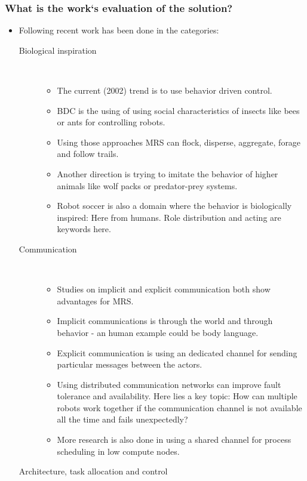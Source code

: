 \subsubsection*{What is the work`s evaluation of the solution?}
\begin{itemize}
    \item Following recent work has been done in the categories: \
    \begin{description}
        \item[Biological inspiration] \ 
        \begin{itemize} 
            \item The current (2002) trend is to use behavior driven control.
            \item BDC is the using of using social characteristics of insects like bees or ants for controlling robots.
            \item Using those approaches MRS can flock, disperse, aggregate, forage and follow trails.
            \item Another direction is trying to imitate the behavior of higher animals like wolf packs or predator-prey systems.
            \item Robot soccer is also a domain where the behavior is biologically inspired: Here from humans. Role distribution and acting are keywords here.
        \end{itemize}
        \item[Communication] \ 
        \begin{itemize} 
            \item Studies on implicit and explicit communication both show advantages for MRS. 
            \item Implicit communications is through the world and through behavior - an human example could be body language.
            \item Explicit communication is using an dedicated channel for sending particular messages between the actors.
            \item Using distributed communication networks can improve fault tolerance and availability. Here lies a key topic: How can multiple robots work together if the communication channel is not available all the time and fails unexpectedly?
            \item More research is also done in using a shared channel for process scheduling in low compute nodes.
        \end{itemize}
        \item[Architecture, task allocation and control] \ 

\end{description}
\end{itemize}
